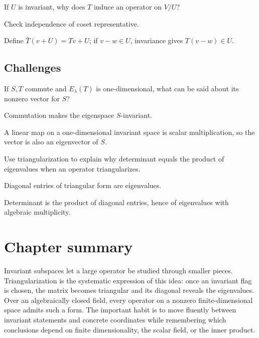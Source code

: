 \begin{exercise}\label{exr:i10-expand-14}
If \(U\) is invariant, why does \(T\) induce an operator on \(V/U\)?
\end{exercise}
\begin{hint}
Check independence of coset representative.
\end{hint}
\begin{solution}
Define \(\bar T(v+U)=Tv+U\); if \(v-w\in U\), invariance gives \(T(v-w)\in U\).
\end{solution}

\subsection*{Challenges}

\begin{exercise}\label{exr:i10-expand-15}
If \(S,T\) commute and \(E_\lambda(T)\) is one-dimensional, what can be said about its nonzero vector for \(S\)?
\end{exercise}
\begin{hint}
Commutation makes the eigenspace \(S\)-invariant.
\end{hint}
\begin{solution}
A linear map on a one-dimensional invariant space is scalar multiplication, so the vector is also an eigenvector of \(S\).
\end{solution}

\begin{exercise}\label{exr:i10-expand-16}
Use triangularization to explain why determinant equals the product of eigenvalues when an operator triangularizes.
\end{exercise}
\begin{hint}
Diagonal entries of triangular form are eigenvalues.
\end{hint}
\begin{solution}
Determinant is the product of diagonal entries, hence of eigenvalues with algebraic multiplicity.
\end{solution}
\section*{Chapter summary}
Invariant subspaces let a large operator be studied through smaller pieces. Triangularization is the systematic expression of this idea: once an invariant flag is chosen, the matrix becomes triangular and its diagonal reveals the eigenvalues. Over an algebraically closed field, every operator on a nonzero finite-dimensional space admits such a form.
The important habit is to move fluently between invariant statements and concrete coordinates while remembering which conclusions depend on finite dimensionality, the scalar field, or the inner product.
